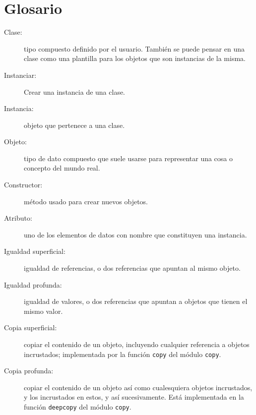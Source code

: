 \section{Glosario}
\begin{description}
\item [{Clase:}] tipo compuesto definido por el usuario. También se puede
pensar en una clase como una plantilla para los objetos que son instancias
de la misma.
\item [{Instanciar:}] Crear una instancia de una clase.
\item [{Instancia:}] objeto que pertenece a una clase.
\item [{Objeto:}] tipo de dato compuesto que suele usarse para representar
una cosa o concepto del mundo real.
\item [{Constructor:}] método usado para crear nuevos objetos.
\item [{Atributo:}] uno de los elementos de datos con nombre que constituyen
una instancia.
\item [{Igualdad superficial:}] igualdad de referencias, o dos referencias
que apuntan al mismo objeto.
\item [{Igualdad profunda:}] igualdad de valores, o dos referencias que
apuntan a objetos que tienen el mismo valor.
\item [{Copia superficial:}] copiar el contenido de un objeto, incluyendo
cualquier referencia a objetos incrustados; implementada por la función
\texttt{copy} del módulo \texttt{copy}.
\item [{Copia profunda:}] copiar el contenido de un objeto así como cualesquiera
objetos incrustados, y los incrustados en estos, y así sucesivamente.
Está implementada en la función \texttt{deepcopy} del módulo \texttt{copy}.

   
  
  
\end{description}

